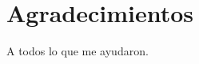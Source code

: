 \setcounter{chapter}{0}
\thispagestyle{empty}
\chapter*{Agradecimientos}


A todos lo que me ayudaron.